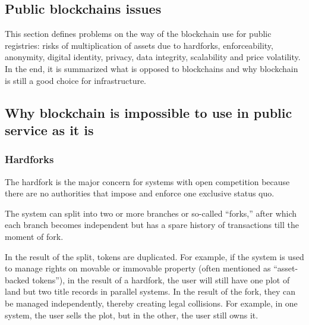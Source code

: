\begin{multicols}{2}
\vspace{-.1cm}

\setcounter{secnumdepth}{5}
\renewcommand\thesubsubsection{\arabic{section}.\arabic{subsection}.\alph{subsubsection}}
\section{Public blockchains issues}\label{sec-03}

This section defines problems on the way of the blockchain use for public registries: risks of multiplication of assets due to hardforks, enforceability, anonymity, digital identity, privacy, data integrity, scalability and price volatility. In the end, it is summarized what is opposed to blockchains and why blockchain is still a good choice for infrastructure.

\vspace{-.2cm}

\subsection{Why blockchain is impossible to use in public service as it is}\label{subsec-03.1}

\vspace{-.2cm}

\subsubsection{Hardforks}\label{subsubsec-03.1.1}

\vspace{-.3cm}

The hardfork is the major concern for systems with open competition because there are no authorities that impose and enforce one exclusive status quo. 

The system can split into two or more branches or so-called “forks,” after which each branch becomes independent but has a spare history of transactions till the moment of fork.

In the result of the split, tokens are duplicated. For example, if the system is used to manage rights on movable or immovable property (often mentioned as “asset-backed tokens”), in the result of a hardfork, the user will still have one plot of land but two title records in parallel systems. In the result of the fork, they can be managed independently, thereby creating legal collisions. For example, in one system, the user sells the plot, but in the other, the user still owns it.


\end{multicols}
